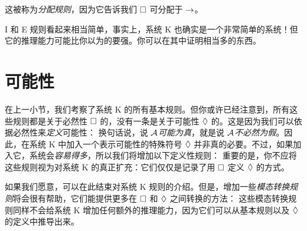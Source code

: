这被称为\emph{分配规则}，因为它告诉我们 $\Box$ 可分配于 $\rightarrow$。

\ebox I 和 \ebox E 规则看起来相当简单，事实上，系统 K 也确实是一个非常简单的系统！但它的推理能力可能比你以为的要强。你可以在其中证明相当多的东西。

\section{可能性}
\label{possibility}

在上一小节，我们考察了系统 K 的所有基本规则。但你或许已经注意到，所有这些规则都是关于必然性 $\Box$ 的，没有一条是关于可能性 $\Diamond$ 的。这是因为我们可以依据必然性来\emph{定义}可能性：
换句话说，说 $\mathcal{A}$\emph{可能为真}，就是说 $\mathcal{A}$\emph{不必然为假}。因此，在系统 K 中加入一个表示可能性的特殊符号 $\Diamond$ 并非真的必要。不过，如果加入它，系统会\emph{容易得多}，所以我们将增加以下定义性规则：
重要的是，你不应将这些规则视为对系统 K 的真正扩充：它们仅仅是记录了用 $\Box$ 定义 $\Diamond$ 的方式。

如果我们愿意，可以在此结束对系统 K 规则的介绍。但是，增加一些\emph{模态转换规则}将会很有帮助，它们能提供更多在 $\Box$ 和 $\Diamond$ 之间转换的方法：
这些模态转换规则同样不会给系统 K 增加任何额外的推理能力，因为它们可以从基本规则以及 $\Diamond$ 的定义中推导出来。

